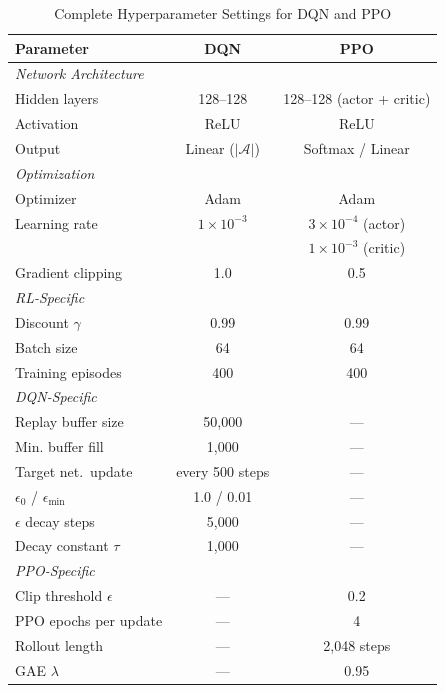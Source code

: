 \documentclass[conference]{IEEEtran}
\begin{document}
\begin{table}[h]
\centering
\caption{Complete Hyperparameter Settings for DQN and PPO}
\label{tab:hyperparams}
\begin{tabular}{lcc}
\toprule
\textbf{Parameter} & \textbf{DQN} & \textbf{PPO} \\
\midrule
\multicolumn{3}{l}{\textit{Network Architecture}} \\
Hidden layers       & 128--128      & 128--128 (actor + critic) \\
Activation          & ReLU          & ReLU \\
Output              & Linear ($|\mathcal{A}|$) & Softmax / Linear \\
\midrule
\multicolumn{3}{l}{\textit{Optimization}} \\
Optimizer           & Adam          & Adam \\
Learning rate       & $1\times10^{-3}$ & $3\times10^{-4}$ (actor) \\
                    &               & $1\times10^{-3}$ (critic) \\
Gradient clipping   & 1.0           & 0.5 \\
\midrule
\multicolumn{3}{l}{\textit{RL-Specific}} \\
Discount $\gamma$   & 0.99          & 0.99 \\
Batch size          & 64            & 64 \\
Training episodes   & 400           & 400 \\
\midrule
\multicolumn{3}{l}{\textit{DQN-Specific}} \\
Replay buffer size  & 50,000        & --- \\
Min. buffer fill    & 1,000         & --- \\
Target net.\ update & every 500 steps & --- \\
$\epsilon_0$ / $\epsilon_{\min}$ & 1.0 / 0.01 & --- \\
$\epsilon$ decay steps & 5,000      & --- \\
Decay constant $\tau$ & 1,000       & --- \\
\midrule
\multicolumn{3}{l}{\textit{PPO-Specific}} \\
Clip threshold $\epsilon$ & ---     & 0.2 \\
PPO epochs per update & ---         & 4 \\
Rollout length      & ---           & 2,048 steps \\
GAE $\lambda$       & ---           & 0.95 \\

\end{tabular}
\end{table}
\end{document}
